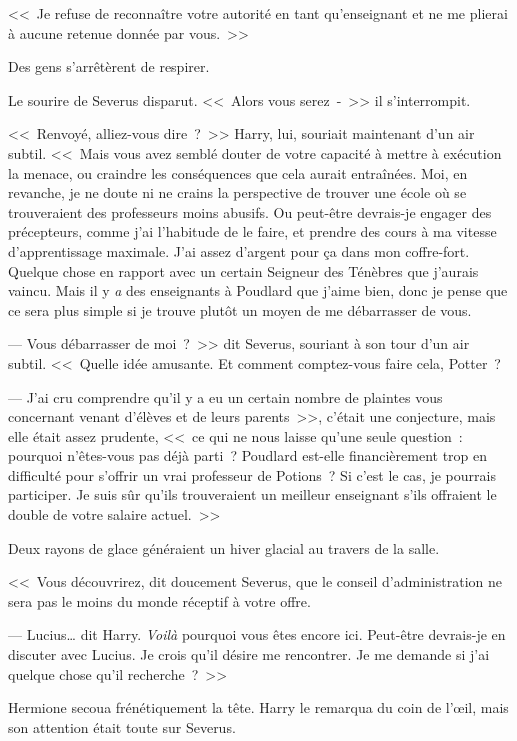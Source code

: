 <<~Je refuse de reconnaître votre autorité en tant qu'enseignant et ne me plierai à aucune retenue donnée par vous.~>>

Des gens s'arrêtèrent de respirer.

Le sourire de Severus disparut. <<~Alors vous serez~-~>> il s'interrompit.

<<~Renvoyé, alliez-vous dire~?~>> Harry, lui, souriait maintenant d'un air subtil. <<~Mais vous avez semblé douter de votre capacité à mettre à exécution la menace, ou craindre les conséquences que cela aurait entraînées. Moi, en revanche, je ne doute ni ne crains la perspective de trouver une école où se trouveraient des professeurs moins abusifs. Ou peut-être devrais-je engager des précepteurs, comme j'ai l'habitude de le faire, et prendre des cours à ma vitesse d'apprentissage maximale. J'ai assez d'argent pour ça dans mon coffre-fort. Quelque chose en rapport avec un certain Seigneur des Ténèbres que j'aurais vaincu. Mais il y \emph{a} des enseignants à Poudlard que j'aime bien, donc je pense que ce sera plus simple si je trouve plutôt un moyen de me débarrasser de vous.

--- Vous débarrasser de moi~?~>> dit Severus, souriant à son tour d'un air subtil. <<~Quelle idée amusante. Et comment comptez-vous faire cela, Potter~?

--- J'ai cru comprendre qu'il y a eu un certain nombre de plaintes vous concernant venant d'élèves et de leurs parents~>>, c'était une conjecture, mais elle était assez prudente, <<~ce qui ne nous laisse qu'une seule question~: pourquoi n'êtes-vous pas déjà parti~? Poudlard est-elle financièrement trop en difficulté pour s'offrir un vrai professeur de Potions~? Si c'est le cas, je pourrais participer. Je suis sûr qu'ils trouveraient un meilleur enseignant s'ils offraient le double de votre salaire actuel.~>>

Deux rayons de glace généraient un hiver glacial au travers de la salle.

<<~Vous découvrirez, dit doucement Severus, que le conseil d'administration ne sera pas le moins du monde réceptif à votre offre.

--- Lucius… dit Harry. \emph{Voilà} pourquoi vous êtes encore ici. Peut-être devrais-je en discuter avec Lucius. Je crois qu'il désire me rencontrer. Je me demande si j'ai quelque chose qu'il recherche~?~>>

Hermione secoua frénétiquement la tête. Harry le remarqua du coin de l'œil, mais son attention était toute sur Severus.

